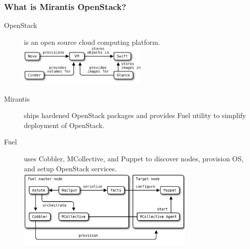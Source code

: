 \documentclass[hyperref=unicode,utf8,xcolor=pst]{beamer}
\begin{document}
\begin{frame}
	\frametitle{What is Mirantis OpenStack?}
	\begin{description}
		\item[OpenStack] is an open source cloud computing
			platform.\\
			\vspace{0.5ex}
			\includegraphics[height=2cm]{openstack-components}
		\item[Mirantis] ships hardened OpenStack packages and
			provides Fuel utility to simplify deployment of
			OpenStack.
		\item[Fuel] uses Cobbler, MCollective, and Puppet to
			discover nodes, provision OS, and setup
			OpenStack services.\\
			\vspace{0.5ex}
			\includegraphics[height=3.8cm]{fuel-components}
	\end{description}
\end{frame}
\end{document}
